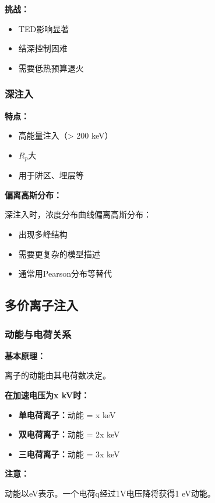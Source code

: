 \documentclass[UTF8,12pt,a4paper]{ctexart}
\begin{document}
\textbf{挑战：}
\begin{itemize}
    \item TED影响显著
    \item 结深控制困难
    \item 需要低热预算退火
\end{itemize}

\subsubsection{深注入}

\textbf{特点：}
\begin{itemize}
    \item 高能量注入（> 200 keV）
    \item $R_p$大
    \item 用于阱区、埋层等
\end{itemize}

\textbf{偏离高斯分布：}

深注入时，浓度分布曲线偏离高斯分布：
\begin{itemize}
    \item 出现多峰结构
    \item 需要更复杂的模型描述
    \item 通常用Pearson分布等替代
\end{itemize}

\subsection{多价离子注入}

\subsubsection{动能与电荷关系}

\textbf{基本原理：}

离子的动能由其电荷数决定。

\textbf{在加速电压为x kV时：}

\begin{itemize}
    \item \textbf{单电荷离子：}动能 = x keV
    \item \textbf{双电荷离子：}动能 = 2x keV
    \item \textbf{三电荷离子：}动能 = 3x keV
\end{itemize}

\textbf{注意：}

动能以eV表示。一个电荷q经过1V电压降将获得1 eV动能。
\end{document}
